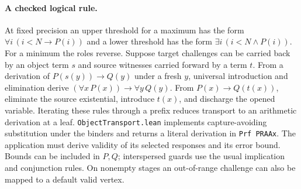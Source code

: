 \paragraph{A checked logical rule.}
At fixed precision an upper threshold for a maximum has the form $\forall i\,(i<N\to P(i))$ and a lower threshold has the form $\exists i\,(i<N\wedge P(i))$. For a minimum the roles reverse. Suppose target challenges can be carried back by an object term $s$ and source witnesses carried forward by a term $t$. From a derivation of $P(s(y))\to Q(y)$ under a fresh $y$, universal introduction and elimination derive $(\forall x\,P(x))\to\forall y\,Q(y)$. From $P(x)\to Q(t(x))$, eliminate the source existential, introduce $t(x)$, and discharge the opened variable. Iterating these rules through a prefix reduces transport to an arithmetic derivation at a leaf. \texttt{ObjectTransport.lean} implements capture-avoiding substitution under the binders and returns a literal derivation in \texttt{Prf PRAAx}. The application must derive validity of its selected responses and its error bound. Bounds can be included in $P,Q$; interspersed guards use the usual implication and conjunction rules. On nonempty stages an out-of-range challenge can also be mapped to a default valid vertex.
